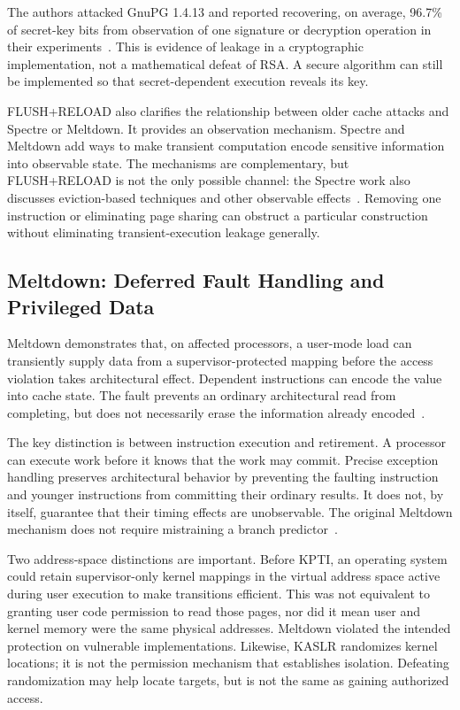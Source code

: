 \documentclass[man,12pt,apacite,nofontenc,nolmodern,floatsintext]{apa6}
\begin{document}
The authors attacked GnuPG 1.4.13 and reported recovering, on average, 96.7\% of secret-key bits from observation of one signature or decryption operation in their experiments~\cite{yarom2014}. This is evidence of leakage in a cryptographic implementation, not a mathematical defeat of RSA. A secure algorithm can still be implemented so that secret-dependent execution reveals its key.

FLUSH+RELOAD also clarifies the relationship between older cache attacks and Spectre or Meltdown. It provides an observation mechanism. Spectre and Meltdown add ways to make transient computation encode sensitive information into observable state. The mechanisms are complementary, but FLUSH+RELOAD is not the only possible channel: the Spectre work also discusses eviction-based techniques and other observable effects~\cite{spectre2019}. Removing one instruction or eliminating page sharing can obstruct a particular construction without eliminating transient-execution leakage generally.

\subsection{Meltdown: Deferred Fault Handling and Privileged Data}
Meltdown demonstrates that, on affected processors, a user-mode load can transiently supply data from a supervisor-protected mapping before the access violation takes architectural effect. Dependent instructions can encode the value into cache state. The fault prevents an ordinary architectural read from completing, but does not necessarily erase the information already encoded~\cite{meltdown2018}.

The key distinction is between instruction execution and retirement. A processor can execute work before it knows that the work may commit. Precise exception handling preserves architectural behavior by preventing the faulting instruction and younger instructions from committing their ordinary results. It does not, by itself, guarantee that their timing effects are unobservable. The original Meltdown mechanism does not require mistraining a branch predictor~\cite{meltdown2018}.

Two address-space distinctions are important. Before KPTI, an operating system could retain supervisor-only kernel mappings in the virtual address space active during user execution to make transitions efficient. This was not equivalent to granting user code permission to read those pages, nor did it mean user and kernel memory were the same physical addresses. Meltdown violated the intended protection on vulnerable implementations. Likewise, KASLR randomizes kernel locations; it is not the permission mechanism that establishes isolation. Defeating randomization may help locate targets, but is not the same as gaining authorized access.
\end{document}
